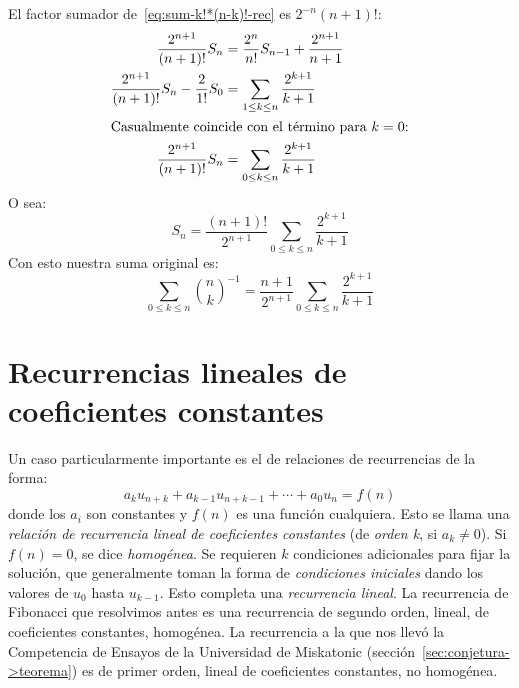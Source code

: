   El factor sumador de~\eqref{eq:sum-k!*(n-k)!-rec} es \(2^{-n} (n + 1)!\):%
  \begin{align*}
    \frac{2^{n + 1}}{(n + 1)!} S_n
      &= \frac{2^n}{n!} S_{n - 1} + \frac{2^{n + 1}}{n + 1} \\
    \frac{2^{n + 1}}{(n + 1)!} S_n - \frac{2}{1!} S_0
      &= \sum_{1 \le k \le n} \frac{2^{k + 1}}{k + 1} \\
  \intertext{Casualmente coincide con el término para \(k = 0\):}
    \frac{2^{n + 1}}{(n + 1)!} S_n
      &= \sum_{0 \le k \le n} \frac{2^{k + 1}}{k + 1}
  \end{align*}
  O sea:
  \begin{equation}
    \label{eq:sum-k!*(n-k)!-value}
    S_n
      = \frac{(n + 1)!}{2^{n + 1}}
	  \sum_{0 \le k \le n} \frac{2^{k + 1}}{k + 1}
  \end{equation}
  Con esto nuestra suma original es:
  \begin{equation}
    \label{eq:reciprocal-binomial-sum}
    \sum_{0 \le k \le n} \binom{n}{k}^{-1}
      = \frac{n + 1}{2^{n + 1}} \sum_{0 \le k \le n} \frac{2^{k + 1}}{k + 1}
  \end{equation}

\section{Recurrencias lineales de coeficientes constantes}
\label{sec:recurrencias-lineales}

  Un caso particularmente importante
  es el de relaciones de recurrencias de la forma:
  \begin{equation*}
    a_k u_{n + k} + a_{k - 1} u_{n + k - 1} + \dotsb + a_0 u_n = f(n)
  \end{equation*}
  donde los \(a_i\) son constantes y \(f(n)\) es una función cualquiera.
  Esto se llama
  una \emph{relación de recurrencia lineal de coeficientes constantes}
  (de \emph{orden k}, si \(a_k \ne 0\)).
  Si \(f(n) = 0\),
  se dice \emph{homogénea}.
  Se requieren \(k\) condiciones adicionales para fijar la solución,
  que generalmente toman la forma de \emph{condiciones iniciales}
  dando los valores de \(u_0\) hasta \(u_{k - 1}\).
  Esto completa una \emph{recurrencia lineal}.
  La recurrencia de Fibonacci que resolvimos antes
  es una recurrencia de segundo orden,
  lineal,
  de coeficientes constantes,
  homogénea.
  La recurrencia a la que nos llevó
  la Competencia de Ensayos de la Universidad de Miskatonic
  (sección~\ref{sec:conjetura->teorema})
  es de primer orden,
  lineal de coeficientes constantes,
  no homogénea.

